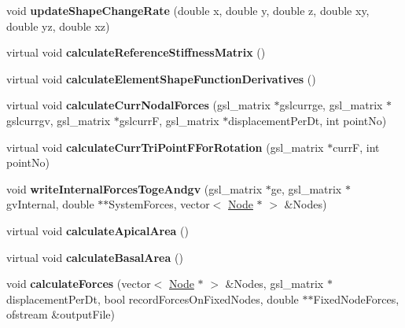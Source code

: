 \begin{DoxyCompactItemize}
\item 
\hypertarget{classShapeBase_a227d409b04d95e3110db851a9cb3ed8c}{}void {\bfseries update\+Shape\+Change\+Rate} (double x, double y, double z, double xy, double yz, double xz)\label{classShapeBase_a227d409b04d95e3110db851a9cb3ed8c}

\item 
\hypertarget{classShapeBase_a1162e815f80b1b9d58c69df731702ecb}{}virtual void {\bfseries calculate\+Reference\+Stiffness\+Matrix} ()\label{classShapeBase_a1162e815f80b1b9d58c69df731702ecb}

\item 
\hypertarget{classShapeBase_ab86b6c4eef2ea6232dd1d0c300ae5602}{}virtual void {\bfseries calculate\+Element\+Shape\+Function\+Derivatives} ()\label{classShapeBase_ab86b6c4eef2ea6232dd1d0c300ae5602}

\item 
\hypertarget{classShapeBase_a794789329f2e957deb1eef163310c982}{}virtual void {\bfseries calculate\+Curr\+Nodal\+Forces} (gsl\+\_\+matrix $\ast$gslcurrge, gsl\+\_\+matrix $\ast$gslcurrgv, gsl\+\_\+matrix $\ast$gslcurr\+F, gsl\+\_\+matrix $\ast$displacement\+Per\+Dt, int point\+No)\label{classShapeBase_a794789329f2e957deb1eef163310c982}

\item 
\hypertarget{classShapeBase_a146919562543c6f08d34cf1ae3e54a51}{}virtual void {\bfseries calculate\+Curr\+Tri\+Point\+F\+For\+Rotation} (gsl\+\_\+matrix $\ast$curr\+F, int point\+No)\label{classShapeBase_a146919562543c6f08d34cf1ae3e54a51}

\item 
\hypertarget{classShapeBase_a0f3186b2f1bfd0c1f012f4cede1074d6}{}void {\bfseries write\+Internal\+Forces\+Toge\+Andgv} (gsl\+\_\+matrix $\ast$ge, gsl\+\_\+matrix $\ast$gv\+Internal, double $\ast$$\ast$System\+Forces, vector$<$ \hyperlink{classNode}{Node} $\ast$ $>$ \&Nodes)\label{classShapeBase_a0f3186b2f1bfd0c1f012f4cede1074d6}

\item 
\hypertarget{classShapeBase_a010092ac7af5667facbbb8fb6bd98976}{}virtual void {\bfseries calculate\+Apical\+Area} ()\label{classShapeBase_a010092ac7af5667facbbb8fb6bd98976}

\item 
\hypertarget{classShapeBase_a0bc80947335afbc181fca326e9a6b7fb}{}virtual void {\bfseries calculate\+Basal\+Area} ()\label{classShapeBase_a0bc80947335afbc181fca326e9a6b7fb}

\item 
\hypertarget{classShapeBase_aca8440ce5566af0d0a6a6d981e9784cc}{}void {\bfseries calculate\+Forces} (vector$<$ \hyperlink{classNode}{Node} $\ast$ $>$ \&Nodes, gsl\+\_\+matrix $\ast$displacement\+Per\+Dt, bool record\+Forces\+On\+Fixed\+Nodes, double $\ast$$\ast$Fixed\+Node\+Forces, ofstream \&output\+File)\label{classShapeBase_aca8440ce5566af0d0a6a6d981e9784cc}


\end{DoxyCompactItemize}
